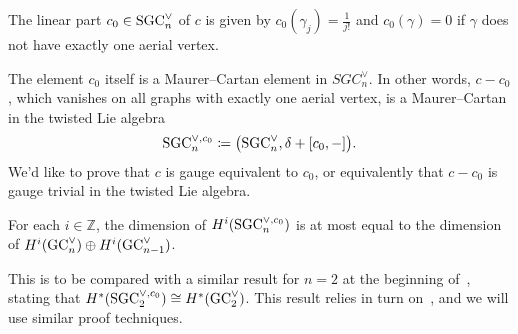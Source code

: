 \begin{definition}
  \label{cnfbnd.def.c0}
  The linear part $c_{0} \in \mathrm{SGC}_{n}^{\vee}$ of $c$ is given by $c_{0}(\gamma_{j}) = \frac{1}{j!}$ and $c_{0}(\gamma) = 0$ if $\gamma$ does not have exactly one aerial vertex.
\end{definition}

The element $c_{0}$ itself is a Maurer--Cartan element in $SGC_{n}^{\vee}$.
In other words, $c - c_{0}$, which vanishes on all graphs with exactly one aerial vertex, is a Maurer--Cartan in the twisted Lie algebra
\begin{equation}
  \mathrm{SGC}_{n}^{\vee, c_{0}} \coloneqq \bigl( \mathrm{SGC}_{n}^{\vee}, \delta + [c_{0}, -] \bigr).
\end{equation}
We'd like to prove that $c$ is gauge equivalent to $c_{0}$, or equivalently that $c-c_{0}$ is gauge trivial in the twisted Lie algebra.

\begin{proposition}
  \label{cnfbnd.prop.h-sgcn}
  For each $i \in \mathbb{Z}$, the dimension of $H^{i}(\mathrm{SGC}_{n}^{\vee, c_{0}})$ is at most equal to the dimension of $H^{i}(\mathrm{GC}_{n}^{\vee}) \oplus H^{i}(\mathrm{GC}_{n-1}^{\vee})$.
\end{proposition}

This is to be compared with a similar result for $n = 2$ at the beginning of~\cite[Section~5]{Willwacher2015a}, stating that $H^{*}(\mathrm{SGC}_{2}^{\vee, c_{0}}) \cong H^{*}(\mathrm{GC}_{2}^{\vee})$.
This result relies in turn on~\cite[Appendix~F]{Willwacher2016}, and we will use similar proof techniques.

